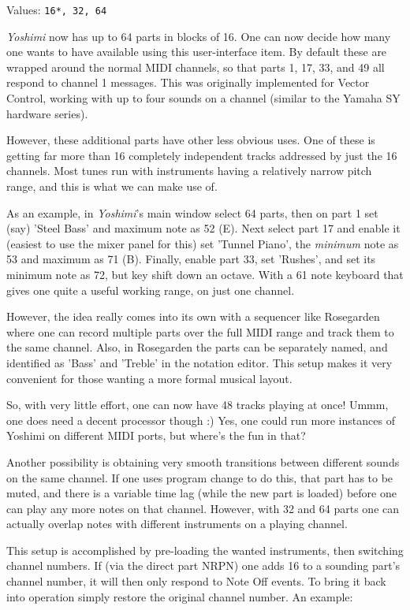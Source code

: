    Values: \texttt{16*, 32, 64}

   \textsl{Yoshimi} now has up to 64 parts in blocks of 16. One can now decide
   how many one wants to have available using this user-interface item.  By
   default these are wrapped around the normal MIDI channels, so that parts 1,
   17, 33, and 49 all respond to channel 1 messages. This was originally
   implemented for Vector Control, working with up to four sounds on a channel
   (similar to the Yamaha SY hardware series).

   However, these additional parts have other less obvious uses. One of these
   is getting far more than 16 completely independent tracks addressed by just
   the 16 channels. Most tunes run with instruments having a relatively narrow
   pitch range, and this is what we can make use of.

   As an example, in \textsl{Yoshimi}'s main window select 64 parts, then on
   part 1 set (say) 'Steel Bass' and maximum note as 52 (E).  Next select part
   17 and enable it (easiest to use the mixer panel for this) set 'Tunnel
   Piano', the \textsl{minimum} note as 53 and maximum as 71 (B).  Finally,
   enable part 33, set 'Rushes', and set its minimum note as 72, but key shift
   down an octave.  With a 61 note keyboard that gives one quite a useful
   working range, on just one channel.

   However, the idea really comes into its own with a sequencer like Rosegarden
   where one can record multiple parts over the full MIDI range and track them
   to the same channel. Also, in Rosegarden the parts can be separately named,
   and identified as 'Bass' and 'Treble' in the notation editor. This setup
   makes it very convenient for those wanting a more formal musical layout.

   So, with very little effort, one can now have 48 tracks playing at once!
   Ummm, one does need a decent processor though :) Yes, one could run more
   instances of Yoshimi on different MIDI ports, but where's the fun in that?

   Another possibility is obtaining very smooth transitions between different
   sounds on the same channel.  If one uses program change to do this, that
   part has to be muted, and there is a variable time lag (while the new part
   is loaded) before one can play any more notes on that channel. However, with
   32 and 64 parts one can actually overlap notes with different instruments on
   a playing channel.

   This setup is accomplished by pre-loading the wanted instruments, then
   switching channel numbers. If (via the direct part NRPN) one adds 16 to a
   sounding part's channel number, it will then only respond to Note Off
   events.  To bring it back into operation simply restore the original channel
   number.  An example:

